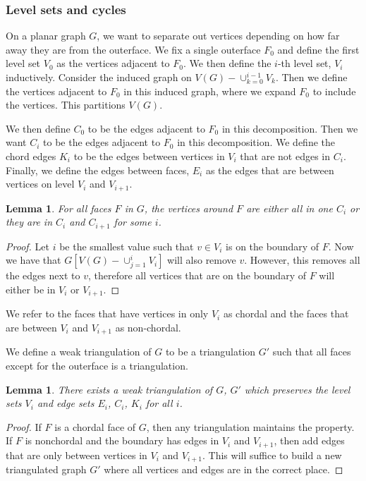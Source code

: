 \documentclass[]{report}
\newtheorem{lemma}[theorem]{Lemma}
\theoremstyle{definition}
\numberwithin{theorem}{section}
\numberwithin{equation}{section}
\begin{document}
\subsubsection{Level sets and cycles}
On a planar graph $G$, we want to separate out vertices depending on how far away they are from the outerface. We fix a single outerface $F_0$ and define the first level set $V_0$ as the vertices adjacent to $F_0$. We then define the $i$-th level set, $V_i$ inductively. Consider the induced graph on $V(G) - \cup_{k = 0}^{i-1} V_k$. Then we define the vertices adjacent to $F_0$ in this induced graph, where we expand $F_0$ to include the vertices. This partitions $V(G)$.

We then define $C_0$ to be the edges adjacent to $F_0$ in this decomposition. Then we want $C_i$ to be the edges adjacent to $F_0$ in this decomposition. We define the chord edges $K_i$ to be the edges between vertices in $V_i$ that are not edges in $C_i$. Finally, we define the edges between faces, $E_i$ as the edges that are between vertices on level $V_i$ and $V_{i + 1}$.

\begin{lemma}
	For all faces $F$ in $G$, the vertices around $F$ are either all in one $C_i$ or they are in $C_i$ and $C_{i + 1}$ for some $i$.
\end{lemma}

\begin{proof}
	Let $i$ be the smallest value such that $v \in V_i$ is on the boundary of $F$. Now we have that $G[V(G) - \cup_{j = 1}^{i} V_i]$ will also remove $v$. However, this removes all the edges next to $v$, therefore all vertices that are on the boundary of $F$ will either be in $V_i$ or $V_{i + 1}$.
\end{proof}
We refer to the faces that have vertices in only $V_i$ as chordal and the faces that are between $V_i$ and $V_{i + 1}$ as non-chordal.

We define a weak triangulation of $G$ to be a triangulation $G'$ such that all faces except for the outerface is a triangulation.
\begin{lemma}
	There exists a weak triangulation of $G$, $G'$ which preserves the level sets $V_i$ and edge sets $E_i$, $C_i$, $K_i$ for all $i$. 
\end{lemma}

\begin{proof}
	If $F$ is a chordal face of $G$, then any triangulation maintains the property. If $F$ is nonchordal and the boundary has edges in $V_i$ and $V_{i + 1}$, then add edges that are only between vertices in $V_i$ and $V_{i + 1}$. This will suffice to build a new triangulated graph $G'$ where all vertices and edges are in the correct place. 
\end{proof}
\end{document}
